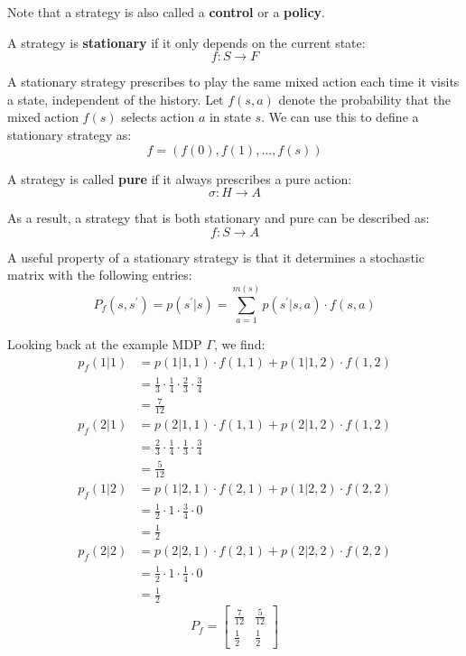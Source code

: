 \documentclass[12pt]{article}
\begin{document}
\noindent
Note that a strategy is also called a \textbf{control} or a \textbf{policy}.

\newpage
\noindent
A strategy is \textbf{stationary} if it only depends on the current state:
\[ f: S \rightarrow F \]

\noindent
A stationary strategy prescribes to play the same mixed action each time it visits a state, independent of the history.
Let $f(s, a)$ denote the probability that the mixed action $f(s)$ selects action $a$ in state $s$.
We can use this to define a stationary strategy as:
\[ f = (f(0), f(1), ... , f(s)) \]

\noindent
A strategy is called \textbf{pure} if it always prescribes a pure action:
\[ \sigma: H \rightarrow A \]

\noindent
As a result, a strategy that is both stationary and pure can be described as:
\[ f: S \rightarrow A \]

\noindent
A useful property of a stationary strategy is that it determines a stochastic matrix with the following entries:
\[ P_f(s, s^\prime) = p(s^\prime | s) = \sum_{a = 1}^{m(s)} p(s^\prime | s, a) \cdot f(s, a) \]

\noindent
Looking back at the example MDP $\Gamma$, we find:
\begin{align*}
    p_f(1 | 1) & = p(1 | 1, 1) \cdot f(1, 1) + p(1 | 1, 2) \cdot f(1, 2) \\
    & = \frac{1}{3} \cdot \frac{1}{4} \cdot \frac{2}{3} \cdot \frac{3}{4} \\
    & = \frac{7}{12} \\
    p_f(2 | 1) & = p(2 | 1, 1) \cdot f(1, 1) + p(2 | 1, 2) \cdot f(1, 2) \\
    & = \frac{2}{3} \cdot \frac{1}{4} \cdot \frac{1}{3} \cdot \frac{3}{4} \\
    & = \frac{5}{12} \\
    p_f(1 | 2) & = p(1 | 2, 1) \cdot f(2, 1) + p(1 | 2, 2) \cdot f(2, 2) \\
    & = \frac{1}{2} \cdot 1 \cdot \frac{3}{4} \cdot 0 \\
    & = \frac{1}{2} \\
    p_f(2 | 2) & = p(2 | 2, 1) \cdot f(2, 1) + p(2 | 2, 2) \cdot f(2, 2) \\
    & = \frac{1}{2} \cdot 1 \cdot \frac{1}{4} \cdot 0 \\
    & = \frac{1}{2}
\end{align*}
\[ P_f = \begin{bmatrix}
    \frac{7}{12} & \frac{5}{12} \\
    \frac{1}{2} & \frac{1}{2}
\end{bmatrix} \]
\end{document}
